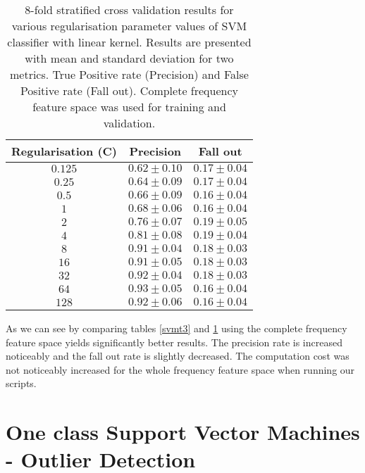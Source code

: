 \documentclass[reqno,openany,12pt]{amsbook}
\begin{document}
\begin{table}
\begin{tabular}{|c|c|c|}
\hline
Regularisation (C) &  Precision & Fall out \\ \hline 
$0.125$ &  $0.62 \pm 0.10$ & $0.17 \pm 0.04$ \\ \hline 
$0.25$ &  $0.64 \pm 0.09$ & $0.17 \pm 0.04$ \\ \hline 
$0.5$ &  $0.66 \pm 0.09$ & $0.16 \pm 0.04$ \\ \hline 
$1$ &  $0.68 \pm 0.06$ & $0.16 \pm 0.04$ \\ \hline 
$2$ &  $0.76 \pm 0.07$ & $0.19 \pm 0.05$ \\ \hline 
$4$ &  $0.81 \pm 0.08$ & $0.19 \pm 0.04$ \\ \hline 
$8$ &  $0.91 \pm 0.04$ & $0.18 \pm 0.03$ \\ \hline 
$16$ &  $0.91 \pm 0.05$ & $0.18 \pm 0.03$ \\ \hline 
$32$ &  $0.92 \pm 0.04$ & $0.18 \pm 0.03$ \\ \hline
$64$ &  $0.93 \pm 0.05$ & $0.16 \pm 0.04$ \\ \hline
$128$ &  $0.92 \pm 0.06$ & $0.16 \pm 0.04$ \\ \hline
\end{tabular}
\vspace{5pt}
\caption{8-fold stratified cross validation results for various regularisation parameter values of SVM classifier with linear kernel. Results are presented with mean and standard deviation for two metrics. True Positive rate (Precision) and False Positive rate (Fall out). Complete frequency feature space was used for training and validation.}
\label{svmt4}
\end{table}

As we can see by comparing tables \ref{svmt3} and \ref{svmt4} using the complete frequency feature space yields significantly better results. The precision rate is increased noticeably and the fall out rate is slightly decreased. The computation cost was not noticeably increased for the whole frequency feature space when running our scripts.





\section{ One class Support Vector Machines - Outlier Detection}
\end{document}
